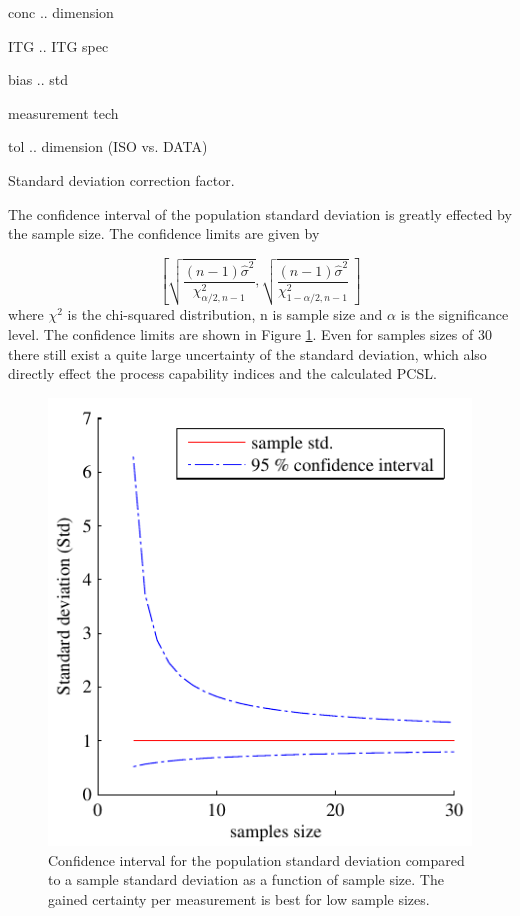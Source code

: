 \documentclass[]{article}
\begin{document}
conc .. dimension

ITG .. ITG spec

bias .. std

measurement tech

tol .. dimension (ISO vs. DATA)



Standard deviation correction factor.



The confidence interval of the population standard deviation is greatly effected by the sample size.  The confidence limits are given by

\begin{equation}
\left[ \sqrt{\frac{(n-1) \hat{\sigma}^2 }{\chi^2_{\alpha/2,n-1}}},  \sqrt{\frac{(n-1) \hat{\sigma}^2 }{\chi^2_{1-\alpha/2,n-1}}} \  \right]
\end{equation}
where $\chi^2$ is the chi-squared distribution, n is sample size and $\alpha$ is the significance level. The confidence limits are shown in Figure \ref{fig:std_uncertainty}. Even for samples sizes of 30 there still exist a quite large uncertainty of the standard deviation, which also directly effect the process capability indices and the calculated PCSL. 

\begin{figure}
\includegraphics{stats_std_confidence.pdf}
\caption{\label{fig:std_uncertainty}Confidence interval for the population standard deviation compared to a sample standard deviation as a function of sample size. The gained certainty per measurement is best for low sample sizes.}
\end{figure}
\end{document}
